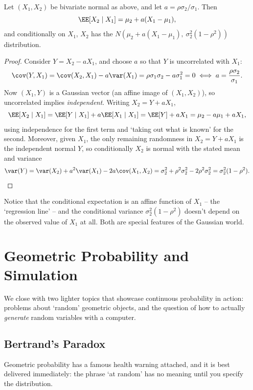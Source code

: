 \begin{proposition}
	Let $(X_1, X_2)$ be bivariate normal as above, and let $a = \rho\sigma_2/\sigma_1$. Then
	$$
	\EE[X_2 \mid X_1] = \mu_2 + a(X_1 - \mu_1),
	$$
	and conditionally on $X_1$, $X_2$ has the $N\!\left(\mu_2 + a(X_1 - \mu_1),\ \sigma_2^2(1 - \rho^2)\right)$ distribution.
\end{proposition}
\begin{proof}
	Consider $Y = X_2 - aX_1$, and choose $a$ so that $Y$ is uncorrelated with $X_1$:
	$$
	\cov(Y, X_1) = \cov(X_2, X_1) - a\var(X_1) = \rho\sigma_1\sigma_2 - a\sigma_1^2 = 0 \iff a = \frac{\rho\sigma_2}{\sigma_1}.
	$$
	Now $(X_1, Y)$ is a Gaussian vector (an affine image of $(X_1, X_2)$), so uncorrelated implies \emph{independent}. Writing $X_2 = Y + aX_1$,
	$$
	\EE[X_2 \mid X_1] = \EE[Y \mid X_1] + a\EE[X_1 \mid X_1] = \EE[Y] + aX_1 = \mu_2 - a\mu_1 + aX_1,
	$$
	using independence for the first term and `taking out what is known' for the second. Moreover, given $X_1$, the only remaining randomness in $X_2 = Y + aX_1$ is the independent normal $Y$, so conditionally $X_2$ is normal with the stated mean and variance
	$$
	\var(Y) = \var(X_2) + a^2\var(X_1) - 2a\cov(X_1, X_2) = \sigma_2^2 + \rho^2\sigma_2^2 - 2\rho^2\sigma_2^2 = \sigma_2^2(1 - \rho^2). \qedhere
	$$
\end{proof}

Notice that the conditional expectation is an affine function of $X_1$ -- the `regression line' -- and the conditional variance $\sigma_2^2(1 - \rho^2)$ doesn't depend on the observed value of $X_1$ at all. Both are special features of the Gaussian world.


\section{Geometric Probability and Simulation}

We close with two lighter topics that showcase continuous probability in action: problems about `random' geometric objects, and the question of how to actually \emph{generate} random variables with a computer.

\subsection{Bertrand's Paradox}

Geometric probability has a famous health warning attached, and it is best delivered immediately: the phrase `at random' has no meaning until you specify the distribution.

